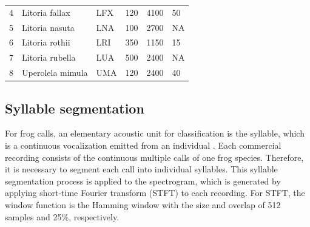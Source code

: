 \begin{table}[htb!]
{\begin{tabular}{llllll}
4            & Litoria fallax              & LFX                   & 120                                                                                 & 4100                                                                   & 50                                                                                   \\ 
5            & Litoria nasuta              & LNA                   & 100                                                                                 & 2700                                                                   & NA                                                                                   \\ 
6            & Litoria rothii              & LRI                   & 350                                                                                 & 1150                                                                   & 15                                                                                   \\ 
7            & Litoria rubella             & LUA                   & 500                                                                                 & 2400                                                                   & NA                                                                                   \\ 
8            & Uperolela mimula            & UMA                   & 120                                                                                 & 2400                                                                   & 40                                                                                   \\ \hline\hline
\end{tabular}
}
\end{table}




\subsection{Syllable segmentation}
For frog calls, an elementary acoustic unit for classification is the syllable, which is a continuous vocalization emitted from an individual \citep{huang2009frog}. Each commercial recording consists of the continuous multiple calls of one frog species. Therefore, it is necessary to segment each call into individual syllables. This syllable segmentation process is applied to the spectrogram, which is generated by applying short-time Fourier transform (STFT) to each recording. For STFT, the window function is the Hamming window with the size and overlap of 512 samples and 25\%, respectively. 


